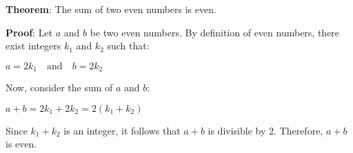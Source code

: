 \documentclass{article}
\begin{document}
\textbf{Theorem}: The sum of two even numbers is even.

\textbf{Proof}: Let $a$ and $b$ be two even numbers. By definition of even numbers, there exist integers $k_1$ and $k_2$ such that:

$a = 2k_1 \quad \text{and} \quad b = 2k_2$

Now, consider the sum of $a$ and $b$:

$a + b = 2k_1 + 2k_2 = 2(k_1 + k_2)$

Since $k_1 + k_2$ is an integer, it follows that $a + b$ is divisible by 2. Therefore, $a + b$ is even.
\end{document}
